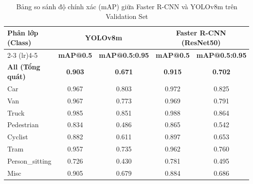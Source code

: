 \documentclass[a4paper]{article}
\theoremstyle{definition}
\begin{document}
\begin{table}[H]
	\centering
	\caption{Bảng so sánh độ chính xác (mAP) giữa Faster R-CNN và YOLOv8m trên Validation Set}
	\begin{tabular}{l c c | c c}
		\toprule
		\multirow{2}{*}{\textbf{Phân lớp (Class)}} & \multicolumn{2}{c|}{\textbf{YOLOv8m}} & \multicolumn{2}{c}{\textbf{Faster R-CNN (ResNet50)}}                                            \\
		\cmidrule(lr){2-3} \cmidrule(lr){4-5}
		                                           & \textbf{mAP@0.5}                      & \textbf{mAP@0.5:0.95}                                & \textbf{mAP@0.5} & \textbf{mAP@0.5:0.95} \\
		\midrule
		\textbf{All (Tổng quát)}                   & \textbf{0.903}                        & \textbf{0.671}                                       & \textbf{0.915}   & \textbf{0.702}        \\
		Car                                        & 0.967                                 & 0.803                                                & 0.972            & 0.825                 \\
		Van                                        & 0.967                                 & 0.773                                                & 0.969            & 0.791                 \\
		Truck                                      & 0.985                                 & 0.851                                                & 0.988            & 0.864                 \\
		Pedestrian                                 & 0.834                                 & 0.486                                                & 0.865            & 0.542                 \\
		Cyclist                                    & 0.882                                 & 0.611                                                & 0.897            & 0.653                 \\
		Tram                                       & 0.957                                 & 0.735                                                & 0.962            & 0.760                 \\
		Person\_sitting                            & 0.726                                 & 0.430                                                & 0.781            & 0.495                 \\
		Misc                                       & 0.905                                 & 0.679                                                & 0.884            & 0.686                 \\
		\bottomrule
	\end{tabular}
\end{table}
\end{document}
